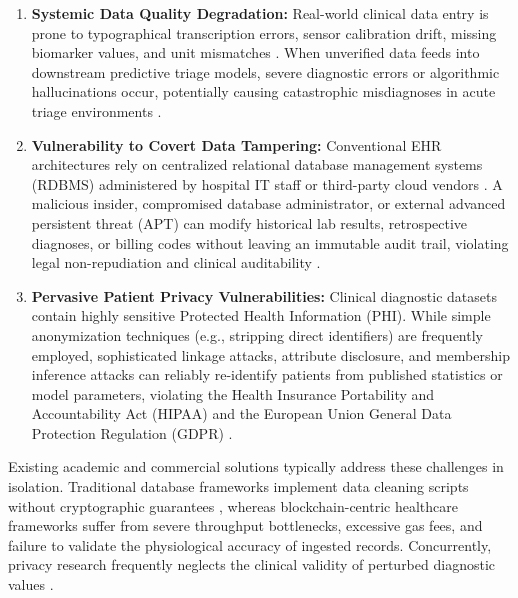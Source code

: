 \documentclass[conference]{IEEEtran}
\begin{document}
\begin{enumerate}
    \item \textbf{Systemic Data Quality Degradation:} Real-world clinical data entry is prone to typographical transcription errors, sensor calibration drift, missing biomarker values, and unit mismatches \cite{kahn2016harmonized, weiskopf2013methods}. When unverified data feeds into downstream predictive triage models, severe diagnostic errors or algorithmic hallucinations occur, potentially causing catastrophic misdiagnoses in acute triage environments \cite{challen2019artificial}.
    \item \textbf{Vulnerability to Covert Data Tampering:} Conventional EHR architectures rely on centralized relational database management systems (RDBMS) administered by hospital IT staff or third-party cloud vendors \cite{al2018survey}. A malicious insider, compromised database administrator, or external advanced persistent threat (APT) can modify historical lab results, retrospective diagnoses, or billing codes without leaving an immutable audit trail, violating legal non-repudiation and clinical auditability \cite{crosby2009efficient, zhang2018blockchain}.
    \item \textbf{Pervasive Patient Privacy Vulnerabilities:} Clinical diagnostic datasets contain highly sensitive Protected Health Information (PHI). While simple anonymization techniques (e.g., stripping direct identifiers) are frequently employed, sophisticated linkage attacks, attribute disclosure, and membership inference attacks \cite{shokri2017membership, sweeney2002k} can reliably re-identify patients from published statistics or model parameters, violating the Health Insurance Portability and Accountability Act (HIPAA) \cite{gostin2009health} and the European Union General Data Protection Regulation (GDPR) \cite{voigt2017eu}.
\end{enumerate}

Existing academic and commercial solutions typically address these challenges in isolation. Traditional database frameworks implement data cleaning scripts without cryptographic guarantees \cite{wang1996beyond}, whereas blockchain-centric healthcare frameworks \cite{yue2016healthcare, eswaran2020patient} suffer from severe throughput bottlenecks, excessive gas fees, and failure to validate the physiological accuracy of ingested records. Concurrently, privacy research frequently neglects the clinical validity of perturbed diagnostic values \cite{dwork2014algorithmic, abadi2016deep}.
\end{document}
